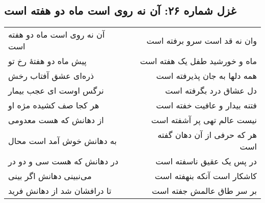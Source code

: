 \begin{center}
\section*{غزل شماره ۲۶: آن نه روی است ماه دو هفته است}
\label{sec:026}
\begin{longtable}{l p{0.5cm} r}
آن نه روی است ماه دو هفته است
&&
وان نه قد است سرو برفته است
\\
پیش ماه دو هفتهٔ رخ تو
&&
ماه و خورشید طفل یک هفته است
\\
ذره‌ای عشق آفتاب رخش
&&
همه دلها به جان پذیرفته است
\\
نرگس اوست ای عجب بیمار
&&
دل عشاق درد بگرفته است
\\
هر کجا صف کشیده مژه او
&&
فتنه بیدار و عافیت خفته است
\\
از دهانش که هست معدومی
&&
نیست عالم تهی پر آشفته است
\\
به دهانش خوش آمد است محال
&&
هر که حرفی از آن دهان گفته است
\\
در دهانش که هست سی و دو در
&&
در پس یک عقیق ناسفته است
\\
می‌نبینی دهانش اگر بینی
&&
کاشکار است آنکه بنهفته است
\\
تا درافشان شد از دهانش فرید
&&
بر سر طاق عالمش جفته است
\\
\end{longtable}
\end{center}
